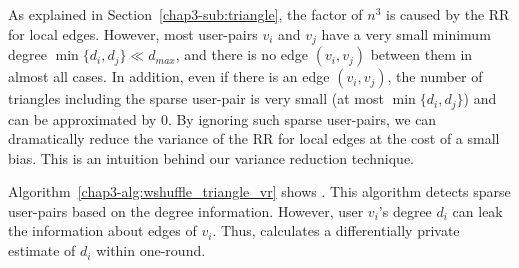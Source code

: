 As explained in Section~\ref{chap3-sub:triangle}, the factor of $n^3$ is caused by the RR for local edges. 
However, most user-pairs $v_i$ and $v_j$ have a very small minimum degree 
$\min\{d_i, d_j\} \ll d_{max}$, 
and there is no edge $(v_i, v_j)$ between them in almost all cases. 
In addition, even if there is an edge $(v_i, v_j)$, the number of triangles including the sparse user-pair is very small 
(at most $\min\{d_i, d_j\}$) 
and can be approximated by $0$. 
By ignoring such sparse user-pairs, we can dramatically reduce the variance of the RR for local edges at the cost of a small bias. 
This is an intuition behind our variance reduction technique. 

Algorithm~\ref{chap3-alg:wshuffle_triangle_vr} shows \AlgWSTriVR{}. 
This algorithm detects sparse user-pairs based on the degree information. 
However, user $v_i$'s degree $d_i$ can leak the information about edges of $v_i$. 
Thus, \AlgWSTriVR{} calculates a differentially private estimate of $d_i$ within one-round. 

